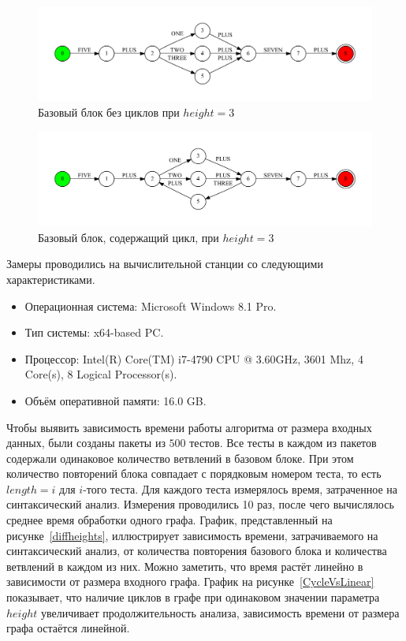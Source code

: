 \begin{figure}[h!]
 \centering
 \includegraphics[width=15cm]{pics/block.pdf}
 \caption{Базовый блок без циклов при $height=3$}
 \label{block}
\end{figure}

\begin{figure}[h!]
 \centering
 \includegraphics[width=15cm]{pics/block_loop.pdf}
 \caption{Базовый блок, содержащий цикл, при $height=3$}
 \label{block_loop}
\end{figure}

Замеры проводились на вычислительной станции со следующими характеристиками.
\begin{itemize}
\item Операционная система: Microsoft Windows 8.1 Pro.
\item Тип системы: x64-based PC.
\item Процессор: Intel(R) Core(TM) i7-4790 CPU @ 3.60GHz, 3601 Mhz, 4 Core(s), 8 Logical Processor(s).
\item Объём оперативной памяти: 16.0 GB.
\end{itemize}

Чтобы выявить зависимость времени работы алгоритма от размера входных данных, были созданы пакеты из $500$ тестов. Все тесты в каждом из пакетов содержали одинаковое количество ветвлений в базовом блоке. 
При этом количество повторений блока совпадает с порядковым номером теста, то есть $length=i$ для $i$-того теста. Для каждого теста измерялось время, затраченное на синтаксический анализ. Измерения проводились 
10 раз, после чего вычислялось среднее время обработки одного графа. График, представленный на рисунке~\ref{diffheights}, иллюстрирует зависимость времени, затрачиваемого на синтаксический анализ, от количества повторения базового блока и количества ветвлений в каждом из них. Можно заметить, что время растёт линейно в зависимости от размера входного графа. График на рисунке~\ref{CycleVsLinear} показывает, что 
наличие циклов в графе при одинаковом значении параметра $height$ увеличивает продолжительность анализа, зависимость времени от размера графа остаётся линейной.


